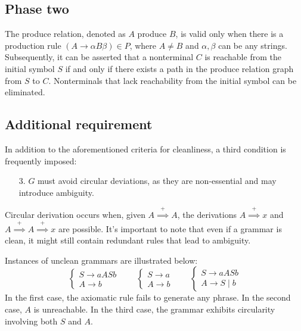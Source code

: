 \subsection{Phase two}
The produce relation, denoted as $A$ produce $B$, is valid only when there is a production rule $(A \rightarrow \alpha B \beta) \in P$, where $A \neq B$ and $\alpha,\beta$ can be any strings.
Subsequently, it can be asserted that a nonterminal $C$ is reachable from the initial symbol $S$ if and only if there exists a path in the produce relation graph from $S$ to $C$. 
Nonterminals that lack reachability from the initial symbol can be eliminated. 

\subsection{Additional requirement}
In addition to the aforementioned criteria for cleanliness, a third condition is frequently imposed:
\begin{enumerate}
    \item [3.] $G$ must avoid circular deviations, as they are non-essential and may introduce ambiguity.
\end{enumerate} 
Circular derivation occurs when, given $A \overset{+}{\implies} A$, the derivations $A \overset{+}{\implies} x$ and $A \overset{+}{\implies} A \overset{+}{\implies} x$ are possible.
It's important to note that even if a grammar is clean, it might still contain redundant rules that lead to ambiguity.
\begin{example}
    Instances of unclean grammars are illustrated below:
    \[\begin{cases}
        S \rightarrow aASb \\
        A \rightarrow b
    \end{cases} 
    \qquad
    \begin{cases}
        S \rightarrow a \\
        A \rightarrow b
    \end{cases} 
    \qquad
    \begin{cases}
        S \rightarrow aASb \\
        A \rightarrow S\mid b
    \end{cases} \]
    In the first case, the axiomatic rule fails to generate any phrase. 
    In the second case, $A$ is unreachable. 
    In the third case, the grammar exhibits circularity involving both $S$ and $A$.
\end{example}